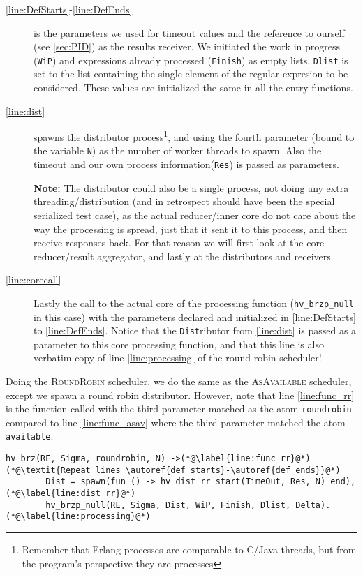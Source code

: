 \begin{description}
\item[\autoref{line:DefStarts}-\ref{line:DefEnds}] is the parameters
  we used for timeout values and the reference to ourself (see
  \autoref{sec:PID}) as the results receiver.  We initiated the work
  in progress (\texttt{WiP}) and expressions already processed
  (\texttt{Finish}) as empty lists. \texttt{Dlist} is set to the list
  containing the single element of the regular expresion to be
  considered. These values are initialized the same in all the entry
  functions.

\item[\autoref{line:dist}] spawns the distributor
  process\footnote{Remember that Erlang processes are comparable to
    C/Java threads, but from the program's perspective they are
    processes}, and using the fourth parameter (bound to the variable
  \texttt{N}) as the number of worker threads to spawn. Also the
  timeout and our own process information(\texttt{Res}) is passed as
  parameters.

  \textbf{Note:} The distributor could also be a single process, not
  doing any extra threading/distribution (and in retrospect should
  have been the special serialized test case), as the actual
  reducer/inner core do not care about the way the processing is
  spread, just that it sent it to this process, and then receive
  responses back. For that reason we will first look at the core
  reducer/result aggregator, and lastly at the distributors and
  receivers.

\item[\autoref{line:corecall}] Lastly the call to the actual core of
  the processing function (\texttt{hv\_brzp\_null} in this case) with
  the parameters declared and initialized in \autoref{line:DefStarts}
  to \autoref{line:DefEnds}. Notice that the \texttt{Dist}ributor from
  \autoref{line:dist} is passed as a parameter to this core processing
  function, and that this line is also verbatim copy of line
  \autoref{line:processing} of the round robin scheduler!
\end{description}

Doing the \textsc{RoundRobin} scheduler, we do the same as the
\textsc{AsAvailable} scheduler, except we spawn a round robin
distributor. However, note that line \autoref{line:func_rr} is the function
called with the third parameter matched as the atom
\texttt{roundrobin} compared to line \autoref{line:func_asav} where the
third parameter matched the atom \texttt{available}.
\begin{lstlisting}[name=hvp2]
hv_brz(RE, Sigma, roundrobin, N) ->(*@\label{line:func_rr}@*)
(*@\textit{Repeat lines \autoref{def_starts}-\autoref{def_ends}}@*)
		Dist = spawn(fun () -> hv_dist_rr_start(TimeOut, Res, N) end),(*@\label{line:dist_rr}@*)
		hv_brzp_null(RE, Sigma, Dist, WiP, Finish, Dlist, Delta).(*@\label{line:processing}@*)
\end{lstlisting}

